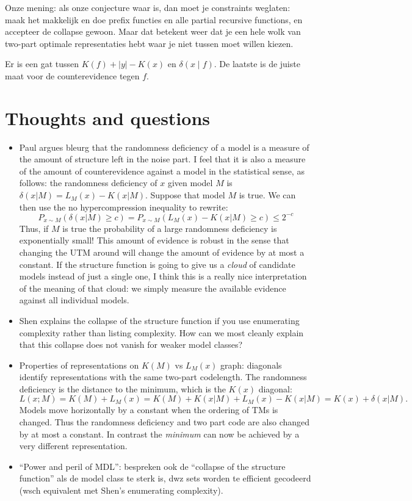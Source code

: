 \documentclass{style/llncs}
\begin{document}
Onze mening: als onze conjecture waar is, dan moet je constraints weglaten: maak het makkelijk en doe prefix functies en alle partial recursive functions, en accepteer de collapse gewoon. Maar dat betekent weer dat je een hele wolk van two-part optimale representaties hebt waar je niet tussen moet willen kiezen.

Er is een gat tussen $K(f)+|y|-K(x)$ en $\delta(x\mid f)$. De laatste is de juiste maat voor de counterevidence tegen $f$.

\section{Thoughts and questions}

\begin{itemize}
\item Paul argues bleurg that the randomness deficiency of a model is a measure of the amount of structure left in the noise part. I feel that it is also a measure of the amount of counterevidence against a model in the statistical sense, as follows: the randomness deficiency of $x$ given model $M$ is $\delta(x|M)=L_M(x)-K(x|M)$. Suppose that model $M$ is true. We can then use the no hypercompression inequality to rewrite:
%
\[
P_{x\sim M}(\delta(x|M)\ge c) = P_{x\sim M}(L_M(x) - K(x|M) \ge c)\le 2^{-c}
\]
Thus, if $M$ is true the probability of a large randomness deficiency is exponentially small! This amount of evidence is robust in the sense that changing the UTM around will change the amount of evidence by at most a constant. If the structure function is going to give us a \emph{cloud} of candidate models instead of just a single one, I think this is a really nice interpretation of the meaning of that cloud: we simply measure the available evidence against all individual models.  

\item Shen explains the collapse of the structure function if you use enumerating complexity rather than listing complexity. How can we most cleanly explain that this collapse does not vanish for weaker model classes?

\item Properties of representations on $K(M)$ vs $L_M(x)$ graph: diagonals identify representations with the same two-part codelength. The randomness deficiency is the distance to the minimum, which is the $K(x)$ diagonal:
\[L(x;M)=K(M)+L_M(x) =K(M)+K(x|M)+L_M(x)-K(x|M)  = K(x)+\delta(x|M).\]
 Models move horizontally by a constant when the ordering of TMs is changed. Thus the randomness deficiency and two part code are also changed by at most a constant. In contrast the \emph{minimum} can now be achieved by a very different representation.

\item ``Power and peril of MDL'': bespreken ook de ``collapse of the structure function'' als de model class te sterk is, dwz sets worden te efficient gecodeerd (wsch equivalent met Shen's enumerating complexity).

\end{itemize}
\end{document}
